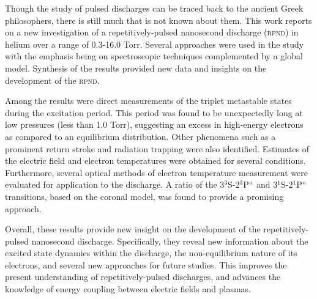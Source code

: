 Though the study of pulsed discharges can be traced back to the ancient Greek
philosophers, there is still much that is not known about them. This work
reports on a new investigation of a repetitively-pulsed nanosecond discharge
(\textsc{rpnd}) in helium over a range of 0.3-16.0 Torr. Several approaches were
used in the study with the emphasis being on spectroscopic techniques
complemented by a global model. Synthesis of the results provided new data and
insights on the development of the \textsc{rpnd}.

Among the results were direct measurements of the triplet metastable states
during the excitation period. This period was found to be unexpectedly long at
low pressures (less than 1.0 Torr), suggesting an excess in high-energy
electrons as compared to an equilibrium distribution. Other phenomena such as a
prominent return stroke and radiation trapping were also identified. Estimates
of the electric field and electron temperatures were obtained for several
conditions. Furthermore, several optical methods of electron temperature
measurement were evaluated for application to the discharge. A ratio of the
3$^3$S-2$^3$P$^\mathrm{o}$ and 3$^1$S-2$^1$P$^\mathrm{o}$ transitions, based on the coronal
model, was found to provide a promising approach.

Overall, these results provide new insight on the development of the
repetitively-pulsed nanosecond discharge. Specifically, they reveal new
information about the excited state dynamics within the discharge, the
non-equilibrium nature of its electrons, and several new approaches for future
studies. This improves the present understanding of repetitively-pulsed
discharges, and advances the knowledge of energy coupling between electric
fields and plasmas.
